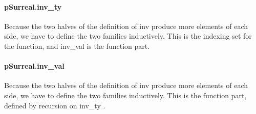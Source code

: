 \documentclass{article}
\begin{document}
\paragraph{pSurreal.inv\_ty}
\par
Because the two halves of the definition of inv produce more elements
of each side, we have to define the two families inductively.
This is the indexing set for the function, and 
\colorbox[RGB]{253,246,227}{{{{\color[RGB]{101, 123, 131} inv\_val }}}} is the function part.
\paragraph{pSurreal.inv\_val}
\par
Because the two halves of the definition of inv produce more elements
of each side, we have to define the two families inductively.
This is the function part, defined by recursion on 
\colorbox[RGB]{253,246,227}{{{{\color[RGB]{101, 123, 131} inv\_ty }}}}.
\end{document}
